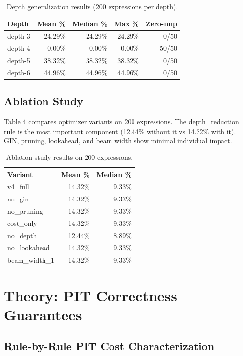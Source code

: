 \documentclass[10pt]{article}
\begin{document}
\begin{table}[h]
\centering
\caption{Depth generalization results (200 expressions per depth).}
\label{tab:depth}
\begin{tabular}{lrrrr}
\toprule
Depth & Mean \% & Median \% & Max \% & Zero-imp \\
\midrule
depth-3 & 24.29\% & 24.29\% & 24.29\% & 0/50 \\
depth-4 & 0.00\% & 0.00\% & 0.00\% & 50/50 \\
depth-5 & 38.32\% & 38.32\% & 38.32\% & 0/50 \\
depth-6 & 44.96\% & 44.96\% & 44.96\% & 0/50 \\
\bottomrule
\end{tabular}
\end{table}

\subsection{Ablation Study}

Table 4 compares optimizer variants on 200 expressions. The depth\_reduction
rule is the most important component (12.44\% without it vs 14.32\% with it).
GIN, pruning, lookahead, and beam width show minimal individual impact.

\begin{table}[h]
\centering
\caption{Ablation study results on 200 expressions.}
\label{tab:ablation}
\begin{tabular}{lrr}
\toprule
Variant & Mean \% & Median \% \\
\midrule
v4\_full & 14.32\% & 9.33\% \\
no\_gin & 14.32\% & 9.33\% \\
no\_pruning & 14.32\% & 9.33\% \\
cost\_only & 14.32\% & 9.33\% \\
no\_depth & 12.44\% & 8.89\% \\
no\_lookahead & 14.32\% & 9.33\% \\
beam\_width\_1 & 14.32\% & 9.33\% \\
\bottomrule
\end{tabular}
\end{table}

\section{Theory: PIT Correctness Guarantees}

\subsection{Rule-by-Rule PIT Cost Characterization}
\end{document}
